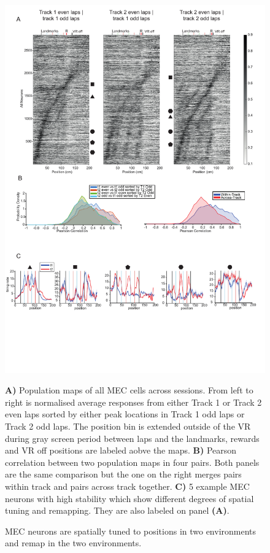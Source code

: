 \begin{figure}
    \centering
    \includegraphics[width=1\linewidth]{figures//Chapter 5 MEC/fig1_MEC_spatial_tuning.pdf}
    \caption{MEC neurons are spatially tuned to positions in two environments and remap in the two environments.}
    \label{fig:MEC remapping}
\medskip
\small
\textbf{A)} Population maps of all MEC cells across sessions. From left to right is normalised average responses from either Track 1 or Track 2 even laps sorted by either peak locations in Track 1 odd laps or Track 2 odd laps. The position bin is extended outside of the VR during gray screen period between laps and the landmarks, rewards and VR off positions are labeled aobve the maps. \textbf{B)} Pearson correlation between two population maps in four pairs. Both panels are the same comparison but the one on the right merges pairs within track and pairs across track together. \textbf{C)} 5 example MEC neurons with high stability which show different degrees of spatial tuning and remapping. They are also labeled on panel \textbf{(A)}.
\end{figure}

